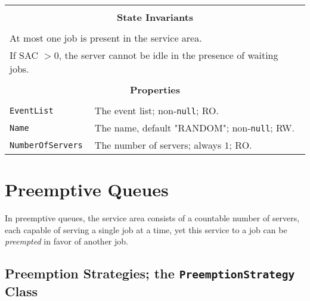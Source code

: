 \documentclass[12pt]{book}
\begin{document}
\begin{tabular}{|l|l|l|}
\hline
\multicolumn{3}{|c|}{} \\
\multicolumn{3}{|c|}{\bf State  Invariants} \\
\multicolumn{3}{|c|}{} \\
\hline
\multicolumn{3}{|l|}{At most one job is present in the service area.} \\
\multicolumn{3}{|l|}{If SAC $> 0$, the server cannot be idle in the presence of waiting jobs.} \\
\hline
\multicolumn{3}{|c|}{} \\
\multicolumn{3}{|c|}{\bf Properties} \\
\multicolumn{3}{|c|}{} \\
\hline
\lstinline|EventList|       & \multicolumn{2}{|l|}{The event list; non-\lstinline|null|; RO.} \\
\hline
\lstinline|Name|            & \multicolumn{2}{|l|}{The name, default "RANDOM"; non-\lstinline|null|; RW.} \\
\hline
\lstinline|NumberOfServers| & \multicolumn{2}{|l|}{The number of servers; always $1$; RO.} \\
\hline
\end{tabular}

\section{Preemptive Queues}

In preemptive queues,
  the service area consists of a countable number of servers,
  each capable of serving a single job at a time,
  yet this service to a job can be {\em preempted\/} in favor of another job.

\subsection{Preemption Strategies; the \lstinline{PreemptionStrategy} Class}
\end{document}

